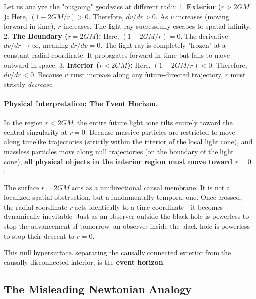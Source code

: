 \documentclass[11pt, a4paper]{report}
\begin{document}
Let us analyze the "outgoing" geodesics at different radii:
1. \textbf{Exterior ($r > 2GM$):} Here, $(1 - 2GM/r) > 0$. Therefore, $dv/dr > 0$. As $v$ increases (moving forward in time), $r$ increases. The light ray successfully escapes to spatial infinity.
2. \textbf{The Boundary ($r = 2GM$):} Here, $(1 - 2GM/r) = 0$. The derivative $dv/dr \to \infty$, meaning $dr/dv = 0$. The light ray is completely "frozen" at a constant radial coordinate. It propagates forward in time but fails to move outward in space.
3. \textbf{Interior ($r < 2GM$):} Here, $(1 - 2GM/r) < 0$. Therefore, $dv/dr < 0$. Because $v$ must increase along any future-directed trajectory, $r$ must strictly \textit{decrease}. 


\paragraph{Physical Interpretation: The Event Horizon.}
In the region $r < 2GM$, the entire future light cone tilts entirely toward the central singularity at $r=0$. Because massive particles are restricted to move along timelike trajectories (strictly within the interior of the local light cone), and massless particles move along null trajectories (on the boundary of the light cone), \textbf{all physical objects in the interior region must move toward $r=0$}. 

The surface $r=2GM$ acts as a unidirectional causal membrane. It is not a localized spatial obstruction, but a fundamentally temporal one. Once crossed, the radial coordinate $r$ acts identically to a time coordinate—it becomes dynamically inevitable. Just as an observer outside the black hole is powerless to stop the advancement of tomorrow, an observer inside the black hole is powerless to stop their descent to $r=0$. 

This null hypersurface, separating the causally connected exterior from the causally disconnected interior, is the \textbf{event horizon}.

\subsection{The Misleading Newtonian Analogy}
\end{document}
